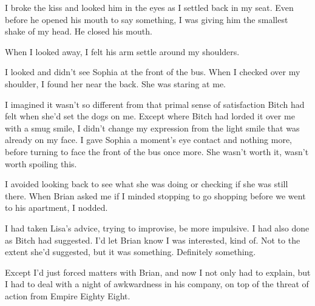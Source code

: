 I broke the kiss and looked him in the eyes as I settled back in my seat.  Even before he opened his mouth to say something, I was giving him the smallest shake of my head.  He closed his mouth.



When I looked away, I felt his arm settle around my shoulders.



I looked and didn't see Sophia at the front of the bus.  When I checked over my shoulder, I found her near the back.  She was staring at me.



I imagined it wasn't so different from that primal sense of satisfaction Bitch had felt when she'd set the dogs on me.  Except where Bitch had lorded it over me with a smug smile, I didn't change my expression from the light smile that was already on my face.  I gave Sophia a moment's eye contact and nothing more, before turning to face the front of the bus once more.  She wasn't worth it, wasn't worth spoiling this.



I avoided looking back to see what she was doing or checking if she was still there.  When Brian asked me if I minded stopping to go shopping before we went to his apartment, I nodded.



I had taken Lisa's advice, trying to improvise, be more impulsive.  I had also done as Bitch had suggested.  I'd let Brian know I was interested, kind of.  Not to the extent she'd suggested, but it was something.  Definitely something.



Except I'd just forced matters with Brian, and now I not only had to explain, but I had to deal with a night of awkwardness in his company, on top of the threat of action from Empire Eighty Eight.





